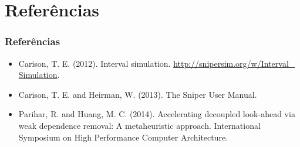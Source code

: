 \documentclass[10pt]{beamer}
\begin{document}
\section{Referências}
\begin{frame}
\frametitle{Referências}

\begin{itemize}
  \item Carison, T. E. (2012). Interval simulation.
  \url{http://snipersim.org/w/Interval_ Simulation}. 
\item Carison, T. E. and Heirman, W. (2013). The Sniper User Manual.
\item Parihar, R. and Huang, M. C. (2014). Accelerating decoupled look-ahead via
weak dependence removal: A metaheuristic approach. International Symposium on High Performance Computer Architecture.
\end{itemize}

\end{frame}
\end{document}
